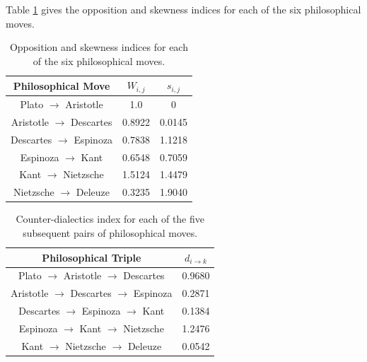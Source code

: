 \documentclass[%
 aip,
 jmp,%
 amsmath,amssymb,
 reprint,%
]{revtex4-1}
\begin{document}


Table \ref{tab:tableOI} gives the opposition and skewness indices
for each of the six philosophical moves.


\begin{table}%
\caption{\label{tab:tableOI}Opposition and skewness indices for each
of the six philosophical moves.  }

\begin{tabular}{|c||c|c|}
\hline
Philosophical Move & $W_{i,j}$ & $s_{i,j}$ \\
\hline \hline
Plato $\rightarrow$ Aristotle     & 1.0    & 0 \\
Aristotle $\rightarrow$ Descartes & 0.8922 & 0.0145 \\
Descartes $\rightarrow$ Espinoza  & 0.7838 & 1.1218 \\
Espinoza $\rightarrow$ Kant       & 0.6548 & 0.7059 \\
Kant $\rightarrow$ Nietzsche      & 1.5124 & 1.4479 \\
Nietzsche $\rightarrow$ Deleuze   & 0.3235 & 1.9040 \\
\hline
\end{tabular}
\end{table}

\begin{table}%
\caption{\label{tab:tableE} Counter-dialectics index for each
of the five subsequent pairs of philosophical moves.  }


\begin{tabular}{|c||c|}
\hline
Philosophical Triple & $d_{i \rightarrow k}$ \\
\hline \hline
Plato $\rightarrow$ Aristotle $\rightarrow$ Descartes &  0.9680 \\
Aristotle $\rightarrow$ Descartes $\rightarrow$ Espinoza & 0.2871 \\
Descartes $\rightarrow$ Espinoza $\rightarrow$ Kant & 0.1384 \\
Espinoza $\rightarrow$ Kant $\rightarrow$ Nietzsche & 1.2476 \\
Kant $\rightarrow$ Nietzsche $\rightarrow$ Deleuze  & 0.0542 \\
\hline
\end{tabular}
\end{table}
\end{document}

